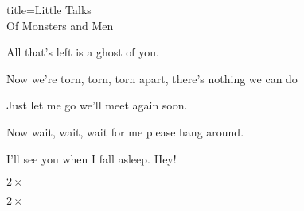 \begin{song}{title=\predtitle\centering Little Talks \\\large Of Monsters and Men  \vspace*{-0.3cm}}
\begin{centerjustified}
    All that's left is a ghost of you.

    Now we're torn, torn, torn apart, there's nothing we can do

    Just let me go we'll meet again soon.

    Now wait, wait, wait for me please hang around.

    I'll see you when I fall asleep. Hey!

 $2 \times$

 $2 \times$




\end{centerjustified}
\setcounter{Slokočet}{0}
\end{song}
